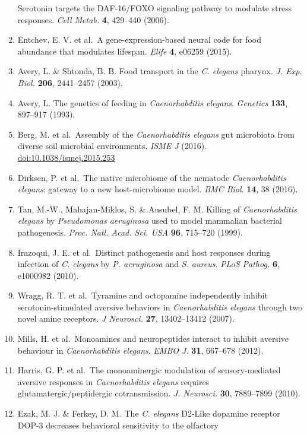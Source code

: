 \documentclass[11pt,]{article}
\begin{document}
\begin{enumerate}
  Serotonin targets the DAF-16/FOXO signaling pathway to modulate stress
  responses. \emph{Cell Metab.} \textbf{4}, 429--440 (2006).
\item
  Entchev, E. V. et al.~A gene-expression-based neural code for food
  abundance that modulates lifespan. \emph{Elife} \textbf{4}, e06259
  (2015).
\item
  Avery, L. \& Shtonda, B. B. Food transport in the \emph{C. elegans}
  pharynx. \emph{J. Exp. Biol.} \textbf{206}, 2441--2457 (2003).
\item
  Avery, L. The genetics of feeding in \emph{Caenorhabditis elegans}.
  \emph{Genetics} \textbf{133}, 897--917 (1993).
\item
  Berg, M. et al.~Assembly of the \emph{Caenorhabditis elegans} gut
  microbiota from diverse soil microbial environments. \emph{ISME J}
  (2016). \url{doi:10.1038/ismej.2015.253}
\item
  Dirksen, P. et al.~The native microbiome of the nematode
  \emph{Caenorhabditis elegans}: gateway to a new host-microbiome model.
  \emph{BMC Biol}. \textbf{14}, 38 (2016).
\item
  Tan, M.-W., Mahajan-Miklos, S. \& Ausubel, F. M. Killing of
  \emph{Caenorhabditis elegans} by \emph{Pseudomonas aeruginosa} used to
  model mammalian bacterial pathogenesis. \emph{Proc. Natl. Acad. Sci.
  USA} \textbf{96}, 715--720 (1999).
\item
  Irazoqui, J. E. et al.~Distinct pathogenesis and host responses during
  infection of \emph{C. elegans} by \emph{P. aeruginosa} and \emph{S.
  aureus}. \emph{PLoS Pathog.} \textbf{6}, e1000982 (2010).
\item
  Wragg, R. T. et al.~Tyramine and octopamine independently inhibit
  serotonin-stimulated aversive behaviors in \emph{Caenorhabditis
  elegans} through two novel amine receptors. \emph{J Neurosci.}
  \textbf{27}, 13402--13412 (2007).
\item
  Mills, H. et al.~Monoamines and neuropeptides interact to inhibit
  aversive behaviour in \emph{Caenorhabditis elegans}. \emph{EMBO J.}
  \textbf{31}, 667--678 (2012).
\item
  Harris, G. P. et al.~The monoaminergic modulation of sensory-mediated
  aversive responses in \emph{Caenorhabditis elegans} requires
  glutamatergic/peptidergic cotransmission. \emph{J. Neurosci.}
  \textbf{30}, 7889--7899 (2010).
\item
  Ezak, M. J. \& Ferkey, D. M. The \emph{C. elegans} D2-Like dopamine
  receptor DOP-3 decreases behavioral sensitivity to the olfactory

\end{enumerate}
\end{document}
